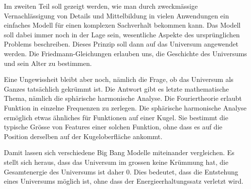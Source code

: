 Im zweiten Teil soll gezeigt werden, wie man durch zweckmässige
Vernachlässigung von Details und Mittelbildung in vielen Anwendungen
ein einfaches Modell für einen komplexen Sachverhalt bekommen kann.
Das Modell soll dabei immer noch in der Lage sein, wesentliche
Aspekte des ursprünglichen Problems beschreiben.
Dieses Prinzip soll dann auf das Universum angewendet werden.
Die Friedmann-Gleichungen erlauben uns, die Geschichte des
Universums und sein Alter zu bestimmen.

Eine Ungewissheit bleibt aber noch, nämlich die Frage, ob das
Universum als Ganzes tatsächlich gekrümmt ist.
Die Antwort gibt es letzte mathematische Thema, nämlich die
sphärische harmonische Analyse.
Die Fouriertheorie erlaubt Funktion in einzelne Frequenzen zu
zerlegen.
Die sphärische harmonische Analyse ermöglich etwas ähnliches
für Funktionen auf einer Kugel. 
Sie bestimmt die typische Grösse von Features einer solchen
Funktion, ohne dass es auf die Position derselben auf der Kugeloberfläche
ankommt.

Damit lassen sich verschiedene Big Bang Modelle miteinander
vergleichen.
Es stellt sich heraus, dass das Universum im grossen keine Krümmung hat,
die Gesamtenergie des Universums ist daher $0$.
Dies bedeutet, dass die Entstehung eines Universums möglich ist,
ohne dass der Energieerhaltungssatz verletzt wird.




